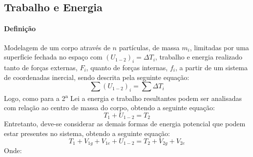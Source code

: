 \documentclass{article}
\begin{document}
        \subsection{Trabalho e Energia}
            \paragraph{Definição}Modelagem de um corpo através de $n$ partículas, de massa $m_{i}$, limitadas por uma superfície fechada no espaço com $(U_{1-2})_{i} = \Delta T_{i}$, trabalho e energia realizado tanto de forças externas, $F_{i}$, quanto de forças internas, $f_{i}$, a partir de um sistema de coordenadas inercial, sendo descrita pela seguinte equação:
                \begin{equation}
                    \sum (U_{1-2})_{i} = \sum \Delta T_{i}
                \end{equation}
            Logo, como para a 2\textsuperscript{a} Lei a energia e trabalho resultantes podem ser analisadas com relação ao centro de massa do corpo, obtendo a seguinte equação:
                \begin{equation}
                    T_{1} + U_{1-2} = T_{2}
                \end{equation}
            Entretanto, deve-se considerar as demais formas de energia potencial que podem estar presentes no sistema, obtendo a seguinte equação:
                \begin{equation}
                    \boxed{
                        T_{1} + V_{1g} + V_{1e} + U_{1-2} = T_{2} + V_{2g} + V_{2e}
                    }
                \end{equation}
            Onde:
\end{document}
